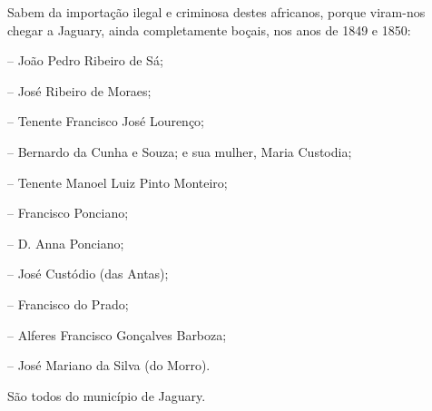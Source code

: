 Sabem da importação ilegal e criminosa destes africanos, porque
viram-nos chegar a Jaguary, ainda completamente boçais, nos anos de 1849
e 1850:

-- João Pedro Ribeiro de Sá;

-- José Ribeiro de Moraes;

-- Tenente Francisco José Lourenço;

-- Bernardo da Cunha e Souza; e sua mulher, Maria Custodia;

-- Tenente Manoel Luiz Pinto Monteiro;

-- Francisco Ponciano;

-- D. Anna Ponciano;

-- José Custódio (das Antas);

-- Francisco do Prado;

-- Alferes Francisco Gonçalves Barboza;

-- José Mariano da Silva (do Morro).

São todos do município de Jaguary.


